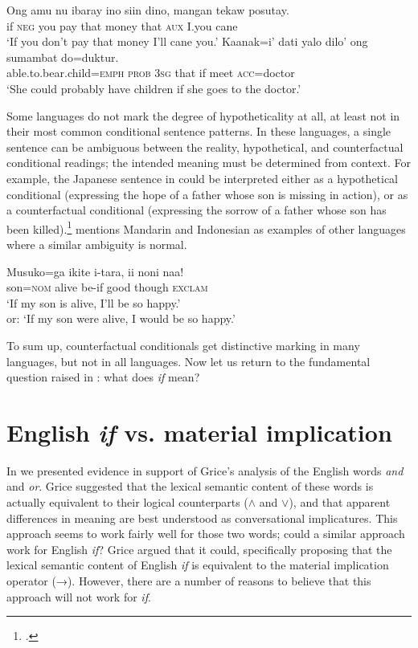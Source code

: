 \ea \label{ex:19.19}
\ea  \gll  Ong  amu  nu  ibaray  ino  siin  dino,  mangan  tekaw  posutay.\\
if  \textsc{neg}  you  pay  that  money  that  \textsc{aux}  I.you  cane\\
\glt ‘If you don’t pay that money I’ll cane you.’
\ex \gll  Kaanak=i’  dati  yalo  dilo’  ong  sumambat  do=duktur.\\
able.to.bear.child=\textsc{emph}  \textsc{prob}  \textsc{3sg}  that  if  meet  \textsc{acc}=doctor\\
\glt ‘She could probably have children if she goes to the doctor.’
\z \z


Some languages do not mark the degree of hypotheticality at all, at least not in their most common conditional sentence patterns. In these languages, a single sentence can be ambiguous between the reality, hypothetical, and counterfactual conditional readings; the intended meaning must be determined from context. For example, the Japanese sentence in  could be interpreted either as a hypothetical conditional (expressing the hope of a father whose son is missing in action), or as a counterfactual conditional (expressing the sorrow of a father whose son has been killed).\footnote{\citet[627]{Akatsuka1985}.} \citet{Comrie1986} mentions Mandarin and Indonesian as examples of other languages where a similar ambiguity is normal.


\ea \label{ex:19.20}
\gll Musuko=ga  ikite  i-tara,  ii  noni  naa!\\
son=\textsc{nom}  alive  be-if  good  though  \textsc{exclam}\\
\glt ‘If my son is alive, I’ll be so happy.’\\
or: ‘If my son were alive, I would be so happy.’
\z


To sum up, counterfactual conditionals get distinctive marking in many languages, but not in all languages. Now let us return to the fundamental question raised in : what does \textit{if} mean?


\section{English \textit{if} vs. material implication}\label{sec:19.4}

In  we presented evidence in support of Grice’s analysis of the English words \textit{and} and \textit{or}. Grice suggested that the lexical semantic content of these words is actually equivalent to their logical counterparts ($\wedge$ and $\vee$), and that apparent differences in meaning are best understood as conversational implicatures. This approach seems to work fairly well for those two words; could a similar approach work for English \textit{if}? Grice argued that it could, specifically proposing that the lexical semantic content of English \textit{if} is equivalent to the material implication operator (→). However, there are a number of reasons to believe that this approach will not work for \textit{if}.



